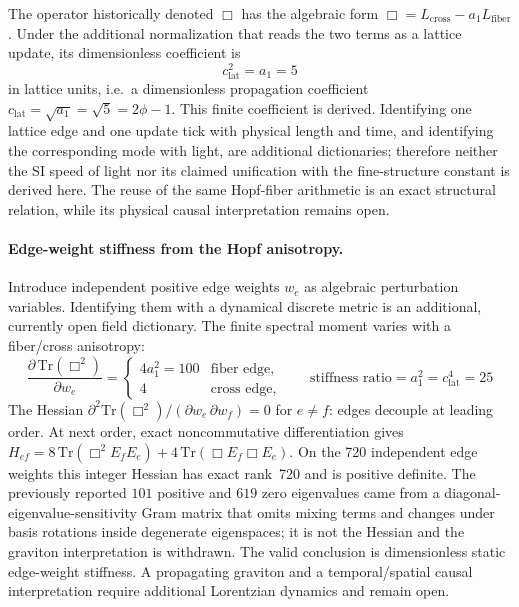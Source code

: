 \documentclass[12pt,a4paper]{article}
\theoremstyle{definition}
\begin{document}
The operator historically denoted $\Box$ has the algebraic form $\Box=L_{\mathrm{cross}}-a_1L_{\mathrm{fiber}}$.  Under the additional normalization that reads the two terms as a lattice update, its dimensionless coefficient is
\begin{equation}
\boxed{c_{\mathrm{lat}}^2 = a_1 = 5}
\label{eq:c_squared}
\end{equation}
in lattice units, i.e.\ a dimensionless propagation coefficient $c_{\mathrm{lat}}=\sqrt{a_1}=\sqrt{5}=2\phi-1$.  This finite coefficient is derived.  Identifying one lattice edge and one update tick with physical length and time, and identifying the corresponding mode with light, are additional dictionaries; therefore neither the SI speed of light nor its claimed unification with the fine-structure constant is derived here.  The reuse of the same Hopf-fiber arithmetic is an exact structural relation, while its physical causal interpretation remains open.

\paragraph{Edge-weight stiffness from the Hopf anisotropy.}
Introduce independent positive edge weights $w_e$ as algebraic perturbation variables.  Identifying them with a dynamical discrete metric is an additional, currently open field dictionary.  The finite spectral moment varies with a fiber/cross anisotropy:
\begin{equation}
\frac{\partial\,\mathrm{Tr}(\Box^2)}{\partial w_e} =
\begin{cases}
4a_1^2 = 100 & \text{fiber edge},\\[2pt]
4 & \text{cross edge},
\end{cases}
\qquad
\boxed{\text{stiffness ratio} = a_1^2 = c_{\mathrm{lat}}^4 = 25}
\label{eq:gravitational_stiffness}
\end{equation}
The Hessian $\partial^2\mathrm{Tr}(\Box^2)/(\partial w_e\,\partial w_f) = 0$ for $e \ne f$: edges decouple at leading order.  At next order, exact noncommutative differentiation gives $H_{ef}=8\,\mathrm{Tr}(\Box^2E_fE_e)+4\,\mathrm{Tr}(\Box E_f\Box E_e)$.  On the 720 independent edge weights this integer Hessian has exact rank~720 and is positive definite.  The previously reported $101$ positive and $619$ zero eigenvalues came from a diagonal-eigenvalue-sensitivity Gram matrix that omits mixing terms and changes under basis rotations inside degenerate eigenspaces; it is not the Hessian and the graviton interpretation is withdrawn.  The valid conclusion is dimensionless static edge-weight stiffness.  A propagating graviton and a temporal/spatial causal interpretation require additional Lorentzian dynamics and remain open.
\end{document}

